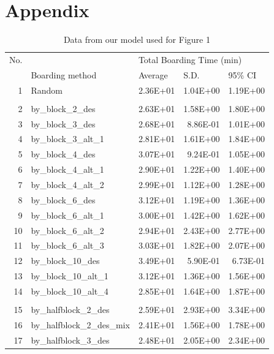 \documentclass[11pt]{article}
\begin{document}
\section{Appendix}

\begin{table}[htbp]
  \centering
  \caption{Data from our model used for Figure 1}
    \begin{tabular}{rlrrr}
    \multicolumn{1}{l}{No.} &       & \multicolumn{3}{l}{Total Boarding Time (min)} \\
          & Boarding method & \multicolumn{1}{l}{Average} & \multicolumn{1}{l}{S.D.} & \multicolumn{1}{l}{95\% CI} \\
    1     & Random & 2.36E+01 & 1.04E+00 & 1.19E+00 \\
          &       &       &       &  \\
    2     & by\_block\_2\_des & 2.63E+01 & 1.58E+00 & 1.80E+00 \\
    3     & by\_block\_3\_des & 2.68E+01 & 8.86E-01 & 1.01E+00 \\
    4     & by\_block\_3\_alt\_1 & 2.81E+01 & 1.61E+00 & 1.84E+00 \\
    5     & by\_block\_4\_des & 3.07E+01 & 9.24E-01 & 1.05E+00 \\
    6     & by\_block\_4\_alt\_1 & 2.90E+01 & 1.22E+00 & 1.40E+00 \\
    7     & by\_block\_4\_alt\_2 & 2.99E+01 & 1.12E+00 & 1.28E+00 \\
    8     & by\_block\_6\_des & 3.12E+01 & 1.19E+00 & 1.36E+00 \\
    9     & by\_block\_6\_alt\_1 & 3.00E+01 & 1.42E+00 & 1.62E+00 \\
    10    & by\_block\_6\_alt\_2 & 2.94E+01 & 2.43E+00 & 2.77E+00 \\
    11    & by\_block\_6\_alt\_3 & 3.03E+01 & 1.82E+00 & 2.07E+00 \\
    12    & by\_block\_10\_des & 3.49E+01 & 5.90E-01 & 6.73E-01 \\
    13    & by\_block\_10\_alt\_1 & 3.12E+01 & 1.36E+00 & 1.56E+00 \\
    14    & by\_block\_10\_alt\_4 & 2.85E+01 & 1.64E+00 & 1.87E+00 \\
          &       &       &       &  \\
    15    & by\_halfblock\_2\_des & 2.59E+01 & 2.93E+00 & 3.34E+00 \\
    16    & by\_halfblock\_2\_des\_mix & 2.41E+01 & 1.56E+00 & 1.78E+00 \\
    17    & by\_halfblock\_3\_des & 2.48E+01 & 2.05E+00 & 2.34E+00 \\

\end{tabular}
\end{table}
\end{document}
